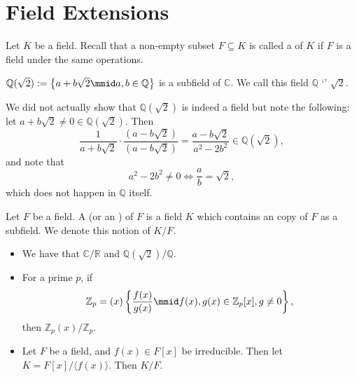 \documentclass[notoc,notitlepage]{tufte-book}
\begin{document}

\section{Field Extensions}%
\label{sec:field_extensions}

Let $K$ be a field. Recall that a non-empty subset $F \subseteq K$ is called a  of $K$
if $F$ is a field under the same operations.

\begin{eg}
  $\mathbb{Q}(\sqrt{2}) := \left\{ a + b\sqrt{2} \mmid a, b \in \mathbb{Q} \right\}$ is a subfield of
  $\mathbb{C}$. We call this field $\mathbb{Q}$ `' $\sqrt{2}$.
\end{eg}

\begin{note}
  We did not actually show that $\mathbb{Q}(\sqrt{2})$ is indeed a field but note the following:
  let $a + b \sqrt{2} \neq 0 \in \mathbb{Q}(\sqrt{2})$. Then
  \begin{equation*}
    \frac{1}{a + b\sqrt{2}} \cdot \frac{(a - b\sqrt{2})}{(a - b \sqrt{2})} = \frac{a - b \sqrt{2}}{a^2 - 2b^2} \in \mathbb{Q}(\sqrt{2}),
  \end{equation*}
  and note that
  \begin{equation*}
    a^2 - 2b^2 \neq 0 \iff \frac{a}{b} = \sqrt{2},
  \end{equation*}
  which does not happen in $\mathbb{Q}$ itself.
\end{note}

\begin{defn}\label{defn:field_extension}
  Let $F$ be a field. A  (or an ) of $F$ is a field $K$
  which contains an  copy of $F$ as a subfield. We denote this notion of $K/F$.
\end{defn}

\begin{eg}
  \begin{itemize}
    \item We have that $\mathbb{C} / \mathbb{R}$ and $\mathbb{Q}(\sqrt{2}) / \mathbb{Q}$.
    \item For a prime $p$, if
      \begin{equation*}
        \mathbb{Z}_p =(x) \left\{ \frac{f(x)}{g(x)} \mmid f(x), g(x) \in \mathbb{Z}_p[x], g \neq 0 \right\},
      \end{equation*}
      then $\mathbb{Z}_p(x) / \mathbb{Z}_p$.
    \item Let $F$ be a field, and $f(x) \in F[x]$ be irreducible. Then let $K = F[x]/\langle f(x) \rangle$.
      Then $K / F$.
  \end{itemize}
\end{eg}
\end{document}

